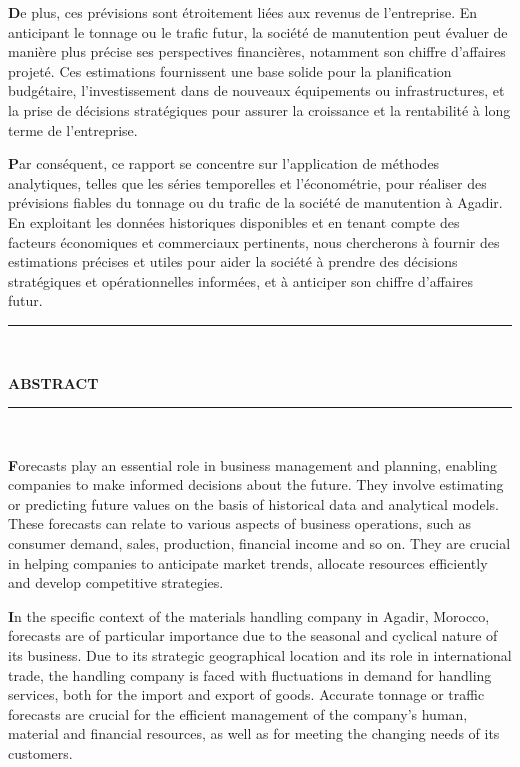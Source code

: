 \documentclass[11pt]{article}
\begin{document}
\textbf{D}e plus, ces prévisions sont étroitement liées aux revenus de l'entreprise. En anticipant le tonnage ou le trafic futur, la société de manutention peut évaluer de manière plus précise ses perspectives financières, notamment son chiffre d'affaires projeté. Ces estimations fournissent une base solide pour la planification budgétaire, l'investissement dans de nouveaux équipements ou infrastructures, et la prise de décisions stratégiques pour assurer la croissance et la rentabilité à long terme de l'entreprise.\vspace{0.5cm}

\textbf{P}ar conséquent, ce rapport se concentre sur l'application de méthodes analytiques, telles que les séries temporelles et l'économétrie, pour réaliser des prévisions fiables du tonnage ou du trafic de la société de manutention à Agadir. En exploitant les données historiques disponibles et en tenant compte des facteurs économiques et commerciaux pertinents, nous chercherons à fournir des estimations précises et utiles pour aider la société à prendre des décisions stratégiques et opérationnelles informées, et à anticiper son chiffre d'affaires futur.


\newpage
\begin{center}
    {\color{cyan}\rule{\linewidth}{0.5mm}} \\[1.5ex]
    
    {\color{cyan}\Huge\bfseries ABSTRACT\par}
    
    {\color{cyan}\rule{\linewidth}{0.5mm}} \\[2ex]
    
\end{center}

\textbf{F}orecasts play an essential role in business management and planning, enabling companies to make informed decisions about the future. They involve estimating or predicting future values on the basis of historical data and analytical models. These forecasts can relate to various aspects of business operations, such as consumer demand, sales, production, financial income and so on. They are crucial in helping companies to anticipate market trends, allocate resources efficiently and develop competitive strategies.\vspace{0.5cm}

\textbf{I}n the specific context of the materials handling company in Agadir, Morocco, forecasts are of particular importance due to the seasonal and cyclical nature of its business. Due to its strategic geographical location and its role in international trade, the handling company is faced with fluctuations in demand for handling services, both for the import and export of goods. Accurate tonnage or traffic forecasts are crucial for the efficient management of the company's human, material and financial resources, as well as for meeting the changing needs of its customers.\vspace{0.5cm}
\end{document}
